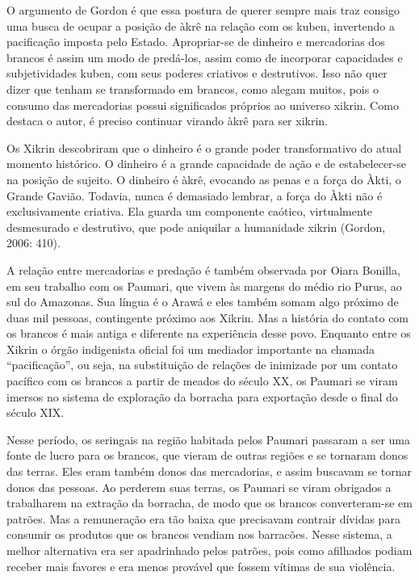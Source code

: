O argumento de Gordon é que essa postura de querer sempre mais traz
consigo uma busca de ocupar a posição de àkrê na relação com os kuben,
invertendo a pacificação imposta pelo Estado. Apropriar-se de dinheiro
e mercadorias dos brancos é assim um modo de predá-los, assim como de
incorporar capacidades e subjetividades kuben, com seus poderes
criativos e destrutivos. Isso não quer dizer que tenham se transformado
em brancos, como alegam muitos, pois o consumo das mercadorias possui
significados próprios ao universo xikrin. Como destaca o autor, é
preciso continuar virando àkrê para ser xikrin.

Os Xikrin descobriram que o dinheiro é o grande poder transformativo do
atual momento histórico. O dinheiro é a grande capacidade de ação e de
estabelecer-se na posição de sujeito. O dinheiro é àkrê, evocando as
penas e a força do Àkti, o Grande Gavião. Todavia, nunca é demasiado
lembrar, a força do Àkti não é exclusivamente criativa. Ela guarda um
componente caótico, virtualmente desmesurado e destrutivo, que pode
aniquilar a humanidade xikrin (Gordon, 2006: 410).

A relação entre mercadorias e predação é também observada por Oiara
Bonilla, em seu trabalho com os Paumari, que vivem às margens do médio
rio Purus, ao sul do Amazonas. Sua língua é o Arawá e eles também somam
algo próximo de duas mil pessoas, contingente próximo aos Xikrin. Mas a
história do contato com os brancos é mais antiga e diferente na
experiência desse povo. Enquanto entre os Xikrin o órgão indigenista
oficial foi um mediador importante na chamada ``pacificação'', ou seja,
na substituição de relações de inimizade por um contato pacífico com os
brancos a partir de meados do século XX, os Paumari se viram imersos no
sistema de exploração da borracha para exportação desde o final do
século XIX.

Nesse período, os seringais na região habitada pelos Paumari passaram a
ser uma fonte de lucro para os brancos, que vieram de outras regiões e
se tornaram donos das terras. Eles eram também donos das mercadorias, e
assim buscavam se tornar donos das pessoas. Ao perderem suas terras, os
Paumari se viram obrigados a trabalharem na extração da borracha, de
modo que os brancos converteram-se em patrões. Mas a remuneração era
tão baixa que precisavam contrair dívidas para consumir os produtos que
os brancos vendiam nos barracões. Nesse sistema, a melhor alternativa
era ser apadrinhado pelos patrões, pois como afilhados podiam receber
mais favores e era menos provável que fossem vítimas de sua violência.

